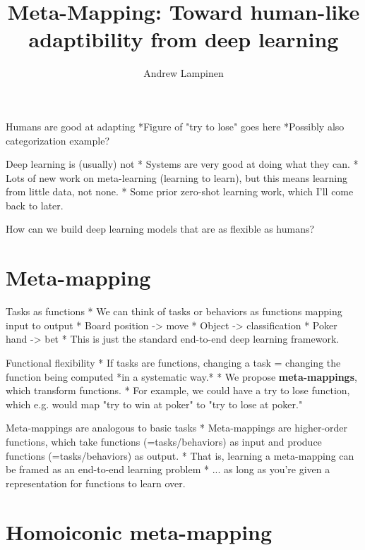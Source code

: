 \documentclass{beamer}
\begin{document}
\title{Meta-Mapping: Toward human-like adaptibility from deep learning}
\author{Andrew Lampinen}
\date{}
\frame{\titlepage}

\begin{frame}{Humans are good at adapting}
*Figure of "try to lose" goes here
*Possibly also categorization example?
\end{frame}

\begin{frame}{Deep learning is (usually) not}
* Systems are very good at doing what they can.
* Lots of new work on meta-learning (learning to learn), but this means learning from little data, not none.
* Some prior zero-shot learning work, which I'll come back to later.
\end{frame}

\begin{frame}[standout]
How can we build deep learning models that are as flexible as humans?
\end{frame}

\section{Meta-mapping}

\begin{frame}{Tasks as functions}
* We can think of tasks or behaviors as functions mapping input to output
    * Board position -> move
    * Object -> classification
    * Poker hand -> bet
* This is just the standard end-to-end deep learning framework.
\end{frame}

\begin{frame}{Functional flexibility}
* If tasks are functions, changing a task = changing the function being computed *in a systematic way.*
* We propose \textbf{meta-mappings}, which transform functions.
* For example, we could have a try to lose function, which e.g. would map "try to win at poker" to "try to lose at poker."
\end{frame}

\begin{frame}{Meta-mappings are analogous to basic tasks}
* Meta-mappings are higher-order functions, which take functions (=tasks/behaviors) as input and produce functions (=tasks/behaviors) as output.
* That is, learning a meta-mapping can be framed as an end-to-end learning problem
* ... as long as you're given a representation for functions to learn over.
\end{frame}

\section{Homoiconic meta-mapping}
\end{document}
